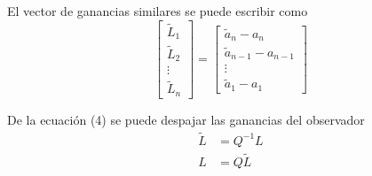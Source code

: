 El vector de ganancias similares se puede escribir como
\[
    \begin{bmatrix}
        \tilde{L}_{1} \\ \tilde{L}_{2} \\ \vdots \\ \tilde{L}_{n}
    \end{bmatrix}
    =
    \begin{bmatrix}
        \tilde{a}_{n} - a_{n} \\
        \tilde{a}_{n-1} -a_{n-1} \\
        \vdots \\
        \tilde{a}_{1} -a_{1}
    \end{bmatrix}
\]

De la ecuación (4) se puede despajar las ganancias del observador
\[
    \begin{split}
        \tilde{L} & = Q^{-1}L \\
        L & = Q\tilde{L}
    \end{split}
\]